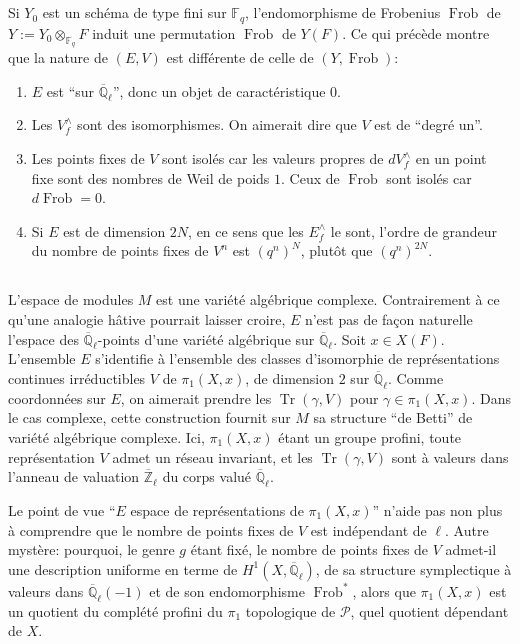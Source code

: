 \documentclass[11pt,a4paper]{article}
\theoremstyle{plain}
\theoremstyle{definition}
\DeclareMathOperator{\Frob}{Frob}
\DeclareMathOperator{\Tr}{Tr}
\newcommand{\F}{\mathbb{F}}
\newcommand{\Ql}{\overline{\mathbb{Q}}_\ell}
\newcommand{\Zl}{\overline{\mathbb{Z}}_\ell}
\begin{document}
\subsection{}
Si $Y_0$ est un sch\'ema de type fini sur $\F_q$, l'endomorphisme de Frobenius $\Frob$ de $Y := Y_0 \otimes_{\F_q} F$ induit une permutation $\Frob$ de $Y(F)$. Ce qui pr\'ec\`ede montre que la nature de $(E,V)$ est diff\'erente de celle de $(Y, \Frob)$:

\begin{enumerate}[label=(\roman*)]
\item $E$ est ``sur $\Ql$'', donc un objet de caract\'eristique $0$.
\item Les $V^\wedge_f$ sont des isomorphismes. On aimerait dire que $V$ est de ``degr\'e un''.
\item Les points fixes de $V$ sont isol\'es car les valeurs propres de $dV^\wedge_f$ en un point fixe sont des nombres de Weil de poids $1$. Ceux de $\Frob$ sont isol\'es car $d\Frob = 0$.
\item Si $E$ est de dimension $2N$, en ce sens que les $E^\wedge_f$ le sont, l'ordre de grandeur du nombre de points fixes de $V^n$ est $(q^n)^N$, plut\^ot que $(q^n)^{2N}$.
\end{enumerate}

\subsection{}
L'espace de modules $M$ est une vari\'et\'e alg\'ebrique complexe. Contrairement \`a ce qu'une analogie h\^ative pourrait laisser croire, $E$ n'est pas de fa\c{c}on naturelle l'espace des $\Ql$-points d'une vari\'et\'e alg\'ebrique sur $\Ql$. Soit $x \in X(F)$. L'ensemble $E$ s'identifie \`a l'ensemble des classes d'isomorphie de repr\'esentations continues irr\'eductibles $V$ de $\pi_1(X,x)$, de dimension $2$ sur $\Ql$. Comme coordonn\'ees sur $E$, on aimerait prendre les $\Tr(\gamma, V)$ pour $\gamma \in \pi_1(X,x)$. Dans le cas complexe, cette construction fournit sur $M$ sa structure ``de Betti'' de vari\'et\'e alg\'ebrique complexe. Ici, $\pi_1(X,x)$ \'etant un groupe profini, toute repr\'esentation $V$ admet un r\'eseau invariant, et les $\Tr(\gamma, V)$ sont \`a valeurs dans l'anneau de valuation $\Zl$ du corps valu\'e $\Ql$.

Le point de vue ``$E$ espace de repr\'esentations de $\pi_1(X,x)$'' n'aide pas non plus \`a comprendre que le nombre de points fixes de $V$ est ind\'ependant de $\ell$. Autre myst\`ere: pourquoi, le genre $g$ \'etant fix\'e, le nombre de points fixes de $V$ admet-il une description uniforme en terme de $H^1(X, \Ql)$, de sa structure symplectique \`a valeurs dans $\Ql(-1)$ et de son endomorphisme $\Frob^*$, alors que $\pi_1(X,x)$ est un quotient du compl\'et\'e profini du $\pi_1$ topologique de $\mathcal{P}$, quel quotient d\'ependant de $X$.
\end{document}

